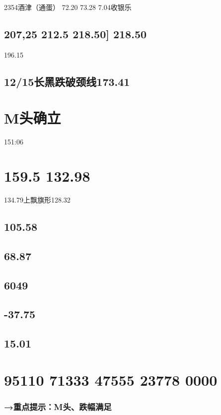 \documentclass{article}
\begin{document}
2354酒津（通蛋） 72.20 73.28 7.04收银乐

\subsection{207,25 212.5 218.50] 218.50}

196.15

\subsection{12/15长黑跌破颈线173.41}

\section{M头确立}

151:06

\section{159.5 132.98}

134.79上飘旗形128.32

\subsection{105.58}

\subsection{68.87}

\subsection{6049}

\subsection{-37.75}

\subsection{15.01}

\section{95110 71333 47555 23778 0000}

\subsubsection{→重点提示：M头、跌幅满足}
\end{document}
